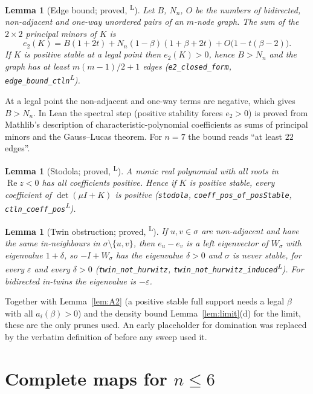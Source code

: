 \documentclass[11pt]{article}
\newtheorem{lemma}[theorem]{Lemma}
\theoremstyle{definition}
\newcommand{\eps}{\varepsilon}
\newcommand{\Rea}{\operatorname{Re}}
\newcommand{\lean}{\textsuperscript{\textsf{L}}}
\begin{document}
\begin{lemma}[Edge bound; proved, \lean]\label{lem:e2}
Let $B$, $N_n$, $O$ be the numbers of bidirected, non-adjacent and one-way unordered pairs of an $m$-node graph. The
sum of the $2\times2$ principal minors of $K$ is
\[
e_2(K)=B(1+2t)+N_n(1-\beta)(1+\beta+2t)+O\bigl(1-t(\beta-2)\bigr).
\]
If $K$ is positive stable at a legal point then $e_2(K)>0$, hence $B>N_n$ and the graph has at least $m(m-1)/2+1$ edges
(\texttt{e2\_closed\_form}, \texttt{edge\_bound\_ctln}\lean).
\end{lemma}
At a legal point the non-adjacent and one-way terms are negative, which gives $B>N_n$. In Lean the spectral step
(positive stability forces $e_2>0$) is proved from Mathlib's description of characteristic-polynomial coefficients as
sums of principal minors and the Gauss--Lucas theorem. For $n=7$ the bound reads ``at least $22$ edges''.

\begin{lemma}[Stodola; proved, \lean]\label{lem:stodola}
A monic real polynomial with all roots in $\Rea z<0$ has all coefficients positive. Hence if $K$ is positive stable,
every coefficient of $\det(\mu I+K)$ is positive (\texttt{stodola}, \texttt{coeff\_pos\_of\_posStable}, \texttt{ctln\_coeff\_pos}\lean).
\end{lemma}

\begin{lemma}[Twin obstruction; proved, \lean]\label{lem:twin}
If $u,v\in\sigma$ are non-adjacent and have the same in-neighbours in $\sigma\setminus\{u,v\}$, then $e_u-e_v$ is a left
eigenvector of $W_\sigma$ with eigenvalue $1+\delta$, so $-I+W_\sigma$ has the eigenvalue $\delta>0$ and $\sigma$ is never
stable, for every $\eps$ and every $\delta>0$ (\texttt{twin\_not\_hurwitz}, \texttt{twin\_not\_hurwitz\_induced}\lean). For
bidirected in-twins the eigenvalue is $-\eps$.
\end{lemma}

Together with Lemma~\ref{lem:A2} (a positive stable full support needs a legal $\beta$ with all $a_i(\beta)>0$) and the
density bound Lemma~\ref{lem:limit}(d) for the limit, these are the only prunes used. An early placeholder for domination
was replaced by the verbatim definition of \cite{Curto2025} before any sweep used it.

\section{Complete maps for \texorpdfstring{$n\le6$}{n <= 6}}\label{sec:n6}
\end{document}
